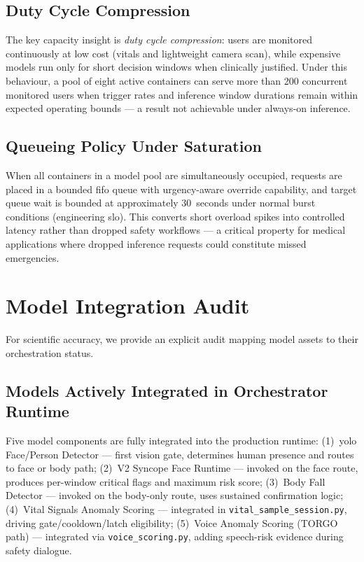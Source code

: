 \documentclass[10pt,twocolumn,a4paper]{article}
\begin{document}
\subsection{Duty Cycle Compression}

The key capacity insight is \emph{duty cycle compression}: users are
monitored continuously at low cost (vitals and lightweight camera
scan), while expensive models run only for short decision windows when
clinically justified.  Under this behaviour, a pool of eight active
containers can serve more than 200 concurrent monitored users when
trigger rates and inference window durations remain within expected
operating bounds — a result not achievable under always-on inference.

\subsection{Queueing Policy Under Saturation}

When all containers in a model pool are simultaneously occupied,
requests are placed in a bounded \gls{fifo} queue with
urgency-aware override capability, and target queue wait is bounded at
approximately 30~seconds under normal burst conditions (engineering
\gls{slo}).  This converts short overload spikes into controlled
latency rather than dropped safety workflows — a critical property for
medical applications where dropped inference requests could constitute
missed emergencies.

\section{Model Integration Audit}

For scientific accuracy, we provide an explicit audit mapping model
assets to their orchestration status.

\subsection{Models Actively Integrated in Orchestrator Runtime}

Five model components are fully integrated into the production runtime:
(1)~\gls{yolo} Face/Person Detector — first vision gate, determines
human presence and routes to face or body path; (2)~V2 Syncope Face
Runtime — invoked on the face route, produces per-window critical
flags and maximum risk score; (3)~Body Fall Detector — invoked on the
body-only route, uses sustained confirmation logic; (4)~Vital Signals
Anomaly Scoring — integrated in \texttt{vital\_sample\_session.py},
driving gate/cooldown/latch eligibility; (5)~Voice Anomaly Scoring
(TORGO path) — integrated via \texttt{voice\_scoring.py}, adding
speech-risk evidence during safety dialogue.
\end{document}
